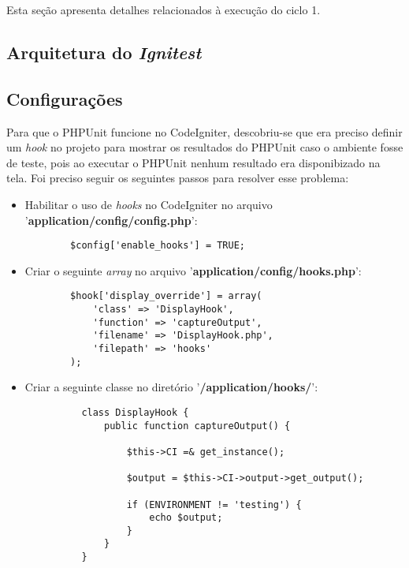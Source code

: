       Esta seção apresenta detalhes relacionados à execução do ciclo 1.
      
      \subsection{Arquitetura do \textit{Ignitest}}
      
	  
      
      \subsection{Configurações}
	  
	  Para que o PHPUnit funcione no CodeIgniter, descobriu-se que era preciso definir um \textit{hook}\footnotemark 
	  no projeto para mostrar os resultados do PHPUnit caso o ambiente fosse de teste, pois ao executar o PHPUnit nenhum
	  resultado era disponibizado na tela. Foi preciso seguir os seguintes passos para resolver esse problema:
	  
	  \begin{itemize}
	  
	   \item Habilitar o uso de \textit{hooks} no CodeIgniter no arquivo '\textbf{application/config/config.php}':
	      
	      \begin{verbatim}
		$config['enable_hooks'] = TRUE;
	      \end{verbatim}
	      
	   \vfill
	   \pagebreak
	   \item Criar o seguinte \textit{array} no arquivo '\textbf{application/config/hooks.php}':
	  
	      \begin{lstlisting}
		$hook['display_override'] = array(
		    'class' => 'DisplayHook',
		    'function' => 'captureOutput',
		    'filename' => 'DisplayHook.php',
		    'filepath' => 'hooks'
		);
	      \end{lstlisting}
	   
	   \item Criar a seguinte classe no diretório '\textbf{/application/hooks/}':
	  
	  \begin{lstlisting}
	      class DisplayHook {
	          public function captureOutput() {

	              $this->CI =& get_instance();
			  
	              $output = $this->CI->output->get_output();

	              if (ENVIRONMENT != 'testing') {
	                  echo $output;
	              }
	          }
	      }
	  \end{lstlisting}
	  
	  \end{itemize}
	  
